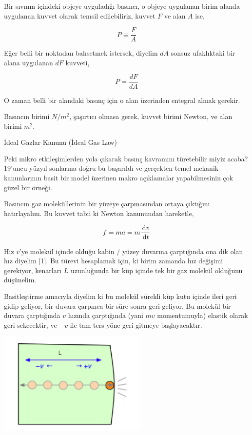 \documentclass[12pt,fleqn]{article}\usepackage{../../common}
\begin{document}
Bir sıvının içindeki objeye uyguladığı basıncı, o objeye uygulanan
birim alanda uygulanan kuvvet olarak temsil edilebiliriz, kuvvet $F$
ve alan $A$ ise,

$$
P \equiv \frac{F}{A}
$$

Eğer belli bir noktadan bahsetmek istersek, diyelim $dA$ sonsuz
ufaklıktaki bir alana uygulanan $dF$ kuvveti,

$$
P = \frac{dF}{dA}
$$

O zaman belli bir alandaki basınç için o alan üzerinden entegral almak gerekir. 

Basıncın birimi $N / m^2$, şaşırtıcı olmasa gerek, kuvvet birimi
Newton, ve alan birimi $m^2$.

İdeal Gazlar Kanunu (İdeal Gas Law)

Peki mikro etkileşimlerden yola çıkarak basınç kavramını türetebilir miyiz
acaba? 19'uncu yüzyıl sonlarına doğru bu başarıldı ve gerçekten temel mekanik
kanunlarının basit bir model üzerinen makro açıklamalar yapabilmesinin çok güzel
bir örneği.

Basıncın gaz moleküllerinin bir yüzeye çarpmasından ortaya çıktığını
hatırlayalım. Bu kuvvet tabii ki Newton kanunundan hareketle,

$$
f = m a = m \frac{\,\mathrm{d} v}{\,\mathrm{d} t}
$$

Hız $v$'ye molekül içinde olduğu kabin / yüzey duvarına çarptığında ona dik olan
hız diyelim [1]. Bu türevi hesaplamak için, ki birim zamanda hız değişimi
gerekiyor, kenarları $L$ uzunluğunda bir küp içinde tek bir gaz molekül olduğunu
düşünelim.

Basitleştirme amacıyla diyelim ki bu molekül sürekli küp kutu içinde ileri geri
gidip geliyor, bir duvara çarpınca bir süre sonra geri geliyor. Bu molekül bir
duvara çarptığında $v$ hızında çarptığında (yani $mv$ momentumuyla) elastik
olarak geri sekecektir, ve $-v$ ile tam ters yöne geri gitmeye başlayacaktır.

\includegraphics[width=20em]{phy_005_basics_04.png}
\end{document}
